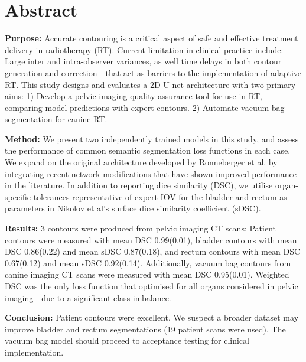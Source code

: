 \chapter{Abstract}
\label{ch:abstract}

\textbf{Purpose:} Accurate contouring is a critical aspect of safe and effective treatment delivery in radiotherapy (RT). Current limitation in clinical practice include: Large inter and intra-observer variances, as well time delays in both contour generation and correction - that act as barriers to the implementation of adaptive RT. This study designs and evaluates a 2D U-net architecture with two primary aims: 1) Develop a pelvic imaging quality assurance tool for use in RT, comparing model predictions with expert contours. 2) Automate vacuum bag segmentation for canine RT.

\textbf{Method:}
 We present two independently trained models in this study, and assess the performance of common semantic segmentation loss functions in each case. We expand on the original architecture developed by Ronneberger et al. by integrating recent network modifications that have shown improved performance in the literature. In addition to reporting dice similarity (DSC), we utilise organ-specific tolerances representative of expert IOV for the bladder and rectum as parameters in Nikolov et al's surface dice similarity coefficient (sDSC).

\textbf{Results:}
3 contours were produced from pelvic imaging CT scans: Patient contours were measured with mean DSC 0.99(0.01), bladder contours with mean DSC 0.86(0.22) and mean sDSC 0.87(0.18), and rectum contours with mean DSC 0.67(0.12) and mean sDSC 0.92(0.14). Additionally, vacuum bag contours from canine imaging CT scans were measured with mean DSC 0.95(0.01). Weighted DSC was the only loss function that optimised for all organs considered in pelvic imaging - due to a significant class imbalance.

\textbf{Conclusion:}
Patient contours were excellent. We suspect a broader dataset may improve bladder and rectum segmentations (19 patient scans were used). The vacuum bag model should proceed to acceptance testing for clinical implementation.